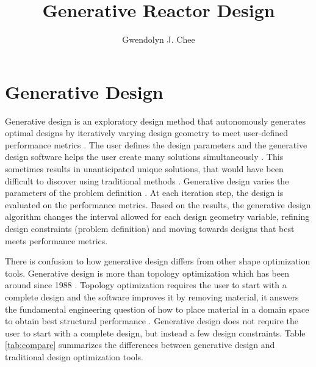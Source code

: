 \documentclass[letterpaper,11pt]{article}
\author{Gwendolyn J. Chee}
\title{Generative Reactor Design}
\begin{document}
\maketitle
\hrulefill
\onehalfspacing

\section{Generative Design}
Generative design is an exploratory design method that autonomously 
generates optimal designs by iteratively varying design geometry 
to meet user-defined performance metrics 
\cite{krish_practical_2011,oh_deep_2019}.
The user defines the design parameters and the generative 
design software helps the user create many solutions 
simultaneously \cite{autodesk_autodesk_2020}. 
This sometimes results in unanticipated unique solutions, that 
would have been difficult to discover using traditional methods
\cite{autodesk_autodesk_2020}.
Generative design varies the parameters of the problem definition
\cite{matejka_dream_2018}. 
At each iteration step, the design is evaluated on the 
performance metrics. 
Based on the results, the generative design algorithm changes the 
interval allowed for each design geometry variable, refining 
design constraints (problem definition) and moving towards 
designs that best meets performance metrics.

There is confusion to how generative design differs from other shape 
optimization tools. 
Generative design is more than topology optimization which has been 
around since 1988 \cite{bendsoe_generating_1988}. 
Topology optimization requires the user to start with a complete design 
and the software improves it by removing material, it answers the 
fundamental engineering question of how to place material in a domain space 
to obtain best structural performance \cite{sigmund_topology_2013}.   
Generative design does not require the user to start with a complete design, but 
instead a few design constraints. 
Table \ref{tab:compare} summarizes the differences between generative design and 
traditional design optimization tools. 
\end{document}
